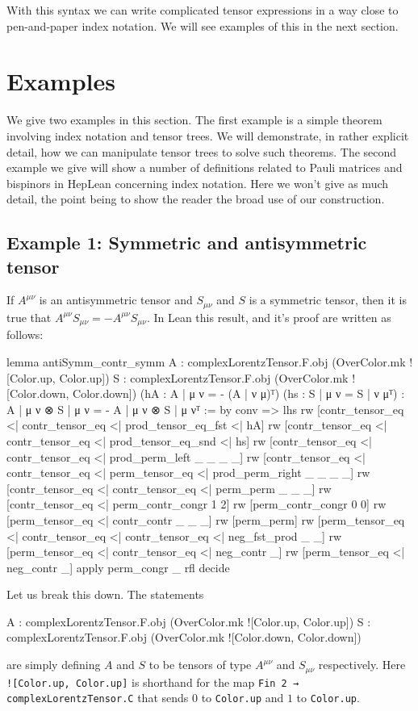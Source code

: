 \documentclass[a4paper, 11pt]{article}
\DeclareRobustCommand{\myinline}{\lstinline}
\begin{document}
With this syntax we can write complicated tensor expressions in a way close to pen-and-paper index notation. 
We will see examples of this in the next section.

\section{Examples} \label{sec:examples}

We give two examples in this section. The first example is a simple theorem involving index notation and 
tensor trees. We will demonstrate, in rather explicit detail, how we can manipulate tensor trees to solve 
such theorems. 
The second example we give will show a number of definitions related to Pauli matrices and bispinors in HepLean concerning index notation.
Here we won't give as much detail, the point being to show the reader the broad use of our 
construction. 

\subsection{Example 1: Symmetric and antisymmetric tensor} \label{sec:exampleSymmAntiSymm}
If $A^{\mu \nu}$ is an antisymmetric tensor and $S_{\mu \nu}$ and $S$ is a symmetric tensor, then
it is true that $A^{\mu \nu} S_{\mu \nu} = - A^{\mu \nu} S_{\mu \nu}$. In Lean this result, and 
it's proof are written as follows: 
\begin{codeLong}
lemma antiSymm_contr_symm 
    {A : complexLorentzTensor.F.obj (OverColor.mk ![Color.up, Color.up])}
    {S : complexLorentzTensor.F.obj (OverColor.mk ![Color.down, Color.down])}
    (hA : {A | μ ν = - (A | ν μ)}ᵀ) (hs : {S | μ ν = S | ν μ}ᵀ) :
    {A | μ ν ⊗ S | μ ν = - A | μ ν ⊗ S | μ ν}ᵀ := by
  conv =>
    lhs
    rw [contr_tensor_eq <| contr_tensor_eq <| prod_tensor_eq_fst <| hA]
    rw [contr_tensor_eq <| contr_tensor_eq <| prod_tensor_eq_snd <| hs]
    rw [contr_tensor_eq <| contr_tensor_eq <| prod_perm_left _ _ _ _]
    rw [contr_tensor_eq <| contr_tensor_eq <| perm_tensor_eq <| prod_perm_right _ _ _ _]
    rw [contr_tensor_eq <| contr_tensor_eq <| perm_perm _ _ _]
    rw [contr_tensor_eq <| perm_contr_congr 1 2]
    rw [perm_contr_congr 0 0]
    rw [perm_tensor_eq <| contr_contr _ _ _]
    rw [perm_perm]
    rw [perm_tensor_eq <| contr_tensor_eq <| contr_tensor_eq <| neg_fst_prod _ _]
    rw [perm_tensor_eq <| contr_tensor_eq <| neg_contr _]
    rw [perm_tensor_eq <| neg_contr _]
  apply perm_congr _ rfl
  decide
\end{codeLong}
Let us break this down. The statements 
\begin{code} 
{A : complexLorentzTensor.F.obj (OverColor.mk ![Color.up, Color.up])}
{S : complexLorentzTensor.F.obj (OverColor.mk ![Color.down, Color.down])}
\end{code}
are simply defining $A$ and $S$ to be tensors of type $A^{\mu \nu}$ and $S_{\mu \nu}$ respectively.
Here \myinline|![Color.up, Color.up]| is shorthand for the map \myinline|Fin 2 → complexLorentzTensor.C| that sends
$0$ to \myinline|Color.up| and $1$ to \myinline|Color.up|.
\end{document}
